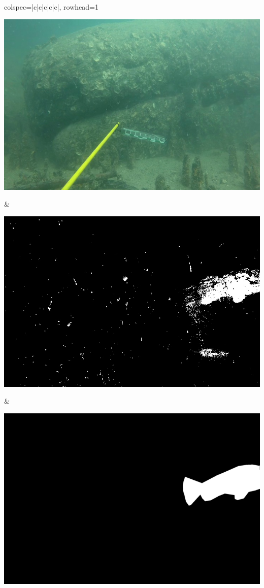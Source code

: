 \begin{longtblr}[
            caption = {Hasil ujicoba proses \textit{background subtraction} menggunakan GMM terhadap video indeks 9908},
            label = {tab:gmm_9908}
        ]{
            colspec={|c|c|c|c|c|},
            rowhead=1
        }
\begin{minipage}{0.24\textwidth}
                \includegraphics[width=\linewidth]{image/9908/9908_original_frame290.jpg}
            \end{minipage} &
            \begin{minipage}{0.24\textwidth}
                \includegraphics[width=\linewidth]{image/9908/9908_gmm_frame290.jpg}
            \end{minipage} &
            \begin{minipage}{0.24\textwidth}
            	\includegraphics[width=\linewidth]{image/9908/9908_groundtruth_290.png}

\end{minipage}
\end{longtblr}

